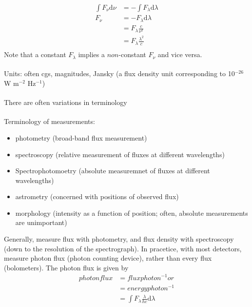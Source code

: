 \documentclass[12pt]{article}
\begin{document}
\begin{align*}
    \int F_{\nu} \textrm{d} \nu &= -\int F_{\lambda} \textrm{d} \lambda\\
    F_{\nu} &= -F_{\lambda} \textrm{d} \lambda\\
    &= F_{\lambda} \frac{c}{\nu^2}\\
    &= F_{\lambda} \frac{\lambda^2}{c}\\
\end{align*}
Note that a constant $F_{\lambda}$ implies a $non$-constant $F_{\nu}$
and vice versa.\\\\
\noindent Units: often cgs, magnitudes, Jansky (a flux density unit
corresponding to 10$^{-26}$ W m$^{-2}$ Hz$^{-1}$)\\\\
\noindent There are often variations in terminology\\\\
\noindent Terminology of measurements:
\begin{itemize}
    \item photometry (broad-band flux measurement)
    \item spectroscopy (relative measurement of fluxes at different wavelengths)
    \item Spectrophotomoetry (absolute measuremnet of fluxes at different wavelengths)
    \item astrometry (concerned with positions of observed flux)
    \item morphology (intensity as a function of position;
        often, absolute measurements are unimportant)
\end{itemize}
Generally, measure flux with photometry, and flux density with spectroscopy
(down to the resolution of the spectrograph). In pracetice, with most detectors,
measure photon flux (photon counting device), rather than every flux (bolometers).
The photon flux is given by
\begin{align*}
    photon flux &= flux photon^{-1} or\\
                &= energy photon^{-1}\\
                &= \int F_{\lambda} \frac{\lambda}{hc} \textrm{d} \lambda
\end{align*}
\end{document}

